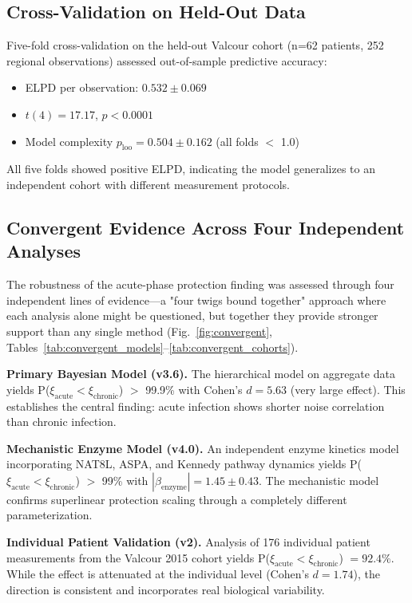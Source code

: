 \documentclass[10pt,a4paper]{article}
\begin{document}
\subsection{Cross-Validation on Held-Out Data}

Five-fold cross-validation on the held-out Valcour cohort (n=62 patients, 252 regional observations) assessed out-of-sample predictive accuracy:

\begin{itemize}
\item ELPD per observation: $0.532 \pm 0.069$
\item $t(4) = 17.17$, $p < 0.0001$
\item Model complexity $p_{\text{loo}} = 0.504 \pm 0.162$ (all folds $<$ 1.0)
\end{itemize}

All five folds showed positive ELPD, indicating the model generalizes to an independent cohort with different measurement protocols.

\subsection{Convergent Evidence Across Four Independent Analyses}

The robustness of the acute-phase protection finding was assessed through four independent lines of evidence---a "four twigs bound together" approach where each analysis alone might be questioned, but together they provide stronger support than any single method (Fig.~\ref{fig:convergent}, Tables~\ref{tab:convergent_models}--\ref{tab:convergent_cohorts}).

\textbf{Primary Bayesian Model (v3.6).} The hierarchical model on aggregate data yields P($\xi_{\text{acute}} < \xi_{\text{chronic}}$) $>$ 99.9\% with Cohen's $d = 5.63$ (very large effect). This establishes the central finding: acute infection shows shorter noise correlation than chronic infection.

\textbf{Mechanistic Enzyme Model (v4.0).} An independent enzyme kinetics model incorporating NAT8L, ASPA, and Kennedy pathway dynamics yields P($\xi_{\text{acute}} < \xi_{\text{chronic}}$) $>$ 99\% with $|\beta_{\text{enzyme}}| = 1.45 \pm 0.43$. The mechanistic model confirms superlinear protection scaling through a completely different parameterization.

\textbf{Individual Patient Validation (v2).} Analysis of 176 individual patient measurements from the Valcour 2015 cohort yields P($\xi_{\text{acute}} < \xi_{\text{chronic}}$) $= 92.4\%$. While the effect is attenuated at the individual level (Cohen's $d = 1.74$), the direction is consistent and incorporates real biological variability.
\end{document}
